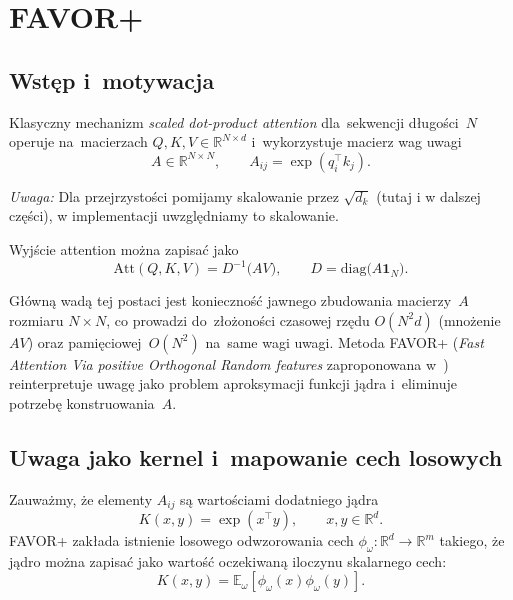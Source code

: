 \documentclass[a4paper,11pt,twoside]{report}
\theoremstyle{definition}
\begin{document}
\section{FAVOR+}
\label{sec:favor}

\subsection{Wstęp i~motywacja}
Klasyczny mechanizm \emph{scaled dot-product attention} dla~sekwencji długości~$N$ operuje na~macierzach
$Q,K,V \in \mathbb{R}^{N\times d}$ i~wykorzystuje macierz wag uwagi
\begin{equation}
A \in \mathbb{R}^{N\times N}, \qquad A_{ij} = \exp(q_i^\top k_j).
\end{equation}

\textit{Uwaga:} Dla przejrzystości pomijamy skalowanie przez $\sqrt{d_k}$ (tutaj i w dalszej części), w implementacji uwzględniamy to skalowanie.

Wyjście attention można zapisać jako
\begin{equation}
\mathrm{Att}(Q,K,V) = D^{-1}\Big(A V\Big), 
\qquad D = \mathrm{diag}\Big(A \mathbf{1}_N\Big).
\end{equation}

Główną wadą tej postaci jest konieczność jawnego zbudowania macierzy~$A$ rozmiaru $N\times N$,
co prowadzi do~złożoności czasowej rzędu $O(N^2 d)$ (mnożenie $A V$) oraz pamięciowej~$O(N^2)$
na~same wagi uwagi. Metoda FAVOR+ (\emph{Fast Attention Via positive Orthogonal Random features} zaproponowana w~\cite{choromanski2021rethinking})
reinterpretuje uwagę jako problem aproksymacji funkcji jądra i~eliminuje potrzebę konstruowania~$A$.

\subsection{Uwaga jako kernel i~mapowanie cech losowych}

Zauważmy, że elementy $A_{ij}$ są wartościami dodatniego jądra
\begin{equation}
K(x,y) = \exp(x^\top y), \qquad x,y\in\mathbb{R}^d.
\end{equation}
FAVOR+ zakłada istnienie losowego odwzorowania cech
$\phi_\omega:\mathbb{R}^d \to \mathbb{R}^m$
takiego, że jądro można zapisać jako wartość oczekiwaną iloczynu skalarnego cech:
\begin{equation}
K(x,y) = \mathbb{E}_{\omega}\!\left[\phi_\omega(x) \phi_\omega(y)\right].
\label{eq:kernel_features}
\end{equation}
\end{document}
